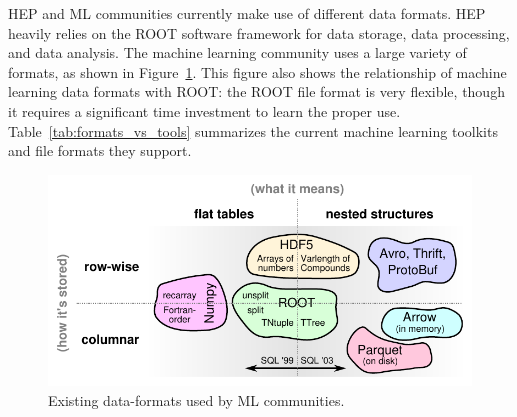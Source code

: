 HEP and ML communities currently make use of different data formats. HEP heavily relies on the ROOT software framework for data storage, data processing, and data analysis. The machine learning community uses a large variety of formats, as shown in Figure~\ref{fig:data-formats}. This figure also shows the relationship of machine learning data formats with ROOT: the ROOT file format is very flexible, though it requires a significant time investment to learn the proper use. Table~\ref{tab:formats_vs_tools} summarizes the current machine learning toolkits and file formats they support.
\begin{figure}
 \centering
 \includegraphics{images/table-of-formats.pdf}
 \caption{Existing data-formats used by ML communities.}\label{fig:data-formats}
\end{figure}

